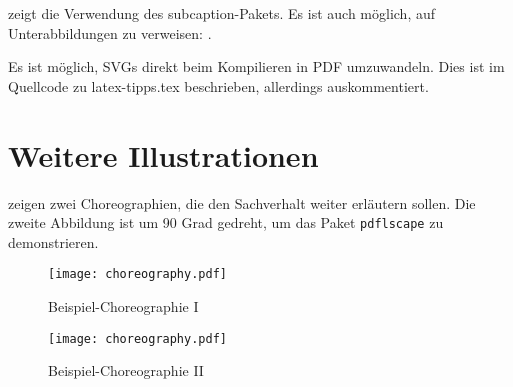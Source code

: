  zeigt die Verwendung des subcaption-Pakets.
Es ist auch möglich, auf Unterabbildungen zu verweisen: .

Es ist möglich, SVGs direkt beim Kompilieren in PDF umzuwandeln.
Dies ist im Quellcode zu latex-tipps.tex beschrieben, allerdings auskommentiert.

\iffalse %
  Das SVG in \cref{fig:directSVG} ist direkt eingebunden, während der Text im SVG in \cref{fig:latexSVG} mittels pdflatex gesetzt ist.
  Falls man die Graphiken sehen möchte, muss inkscape im PATH sein und im Tex-Quelltext \texttt{\textbackslash{}iffalse} und \texttt{\textbackslash{}iftrue} auskommentiert sein.

  \begin{figure}
    \centering
    \texttt{[image: svgexample.svg]}
    \caption{SVG direkt eingebunden}
    \label{fig:directSVG}
  \end{figure}

  \begin{figure}
    \centering
    \def\svgwidth{.4\textwidth}
    
    \caption{Text im SVG mittels \LaTeX{} gesetzt}
    \label{fig:latexSVG}
  \end{figure}
\fi %


\section{Weitere Illustrationen}
 zeigen zwei Choreographien, die den Sachverhalt weiter erläutern sollen.
Die zweite Abbildung ist um 90 Grad gedreht, um das Paket \texttt{pdflscape} zu demonstrieren.

\begin{figure}
  \centering
  \texttt{[image: choreography.pdf]}
  \caption{Beispiel-Choreographie I}
  \label{fig:AnhangsChor}
\end{figure}

\begin{landscape}
  \begin{figure}
    \centering
    \texttt{[image: choreography.pdf]}
    \caption{Beispiel-Choreographie II}
    \label{fig:AnhangsChor2}
  \end{figure}
\end{landscape}


\iffalse

